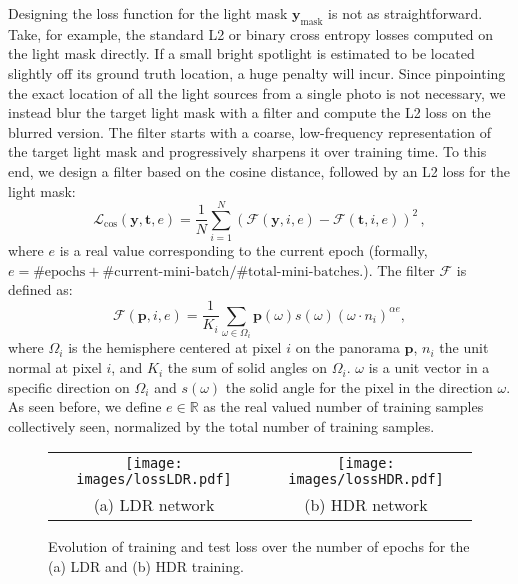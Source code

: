 Designing the loss function for the light mask $\mathbf{y}_\text{mask}$ is not as straightforward. Take, for example, the standard L2 or binary cross entropy losses computed on the light mask directly. If a small bright spotlight is estimated to be located slightly off its ground truth location, a huge penalty will incur. Since pinpointing the exact location of all the light sources from a single photo is not necessary, we instead blur the target light mask with a filter and compute the L2 loss on the blurred version. The filter starts with a coarse, low-frequency representation of the target light mask and progressively sharpens it over training time. To this end, we design a filter based on the cosine distance, followed by an L2 loss for the light mask: 
\begin{equation}
    \mathcal{L}_\text{cos}(\mathbf{y}, \mathbf{t}, e) = \frac{1}{N}\sum_{i=1}^{N} (\mathcal{F}(\mathbf{y}, i, e) - \mathcal{F}(\mathbf{t}, i, e))^2 \,,
    \label{e:maskloss}
\end{equation}
where $e$ is a real value corresponding to the current epoch (formally, $e=\textrm{\#epochs}+\textrm{\#current-mini-batch}/\textrm{\#total-mini-batches}$.). The filter $\mathcal{F}$ is defined as:
\begin{equation}
    \mathcal{F}(\mathbf{p}, i, e) = \frac{1}{K_i} \sum_{\omega \in \Omega_i} \mathbf{p}(\omega) s(\omega) \left( \omega \cdot n_i \right)^{\alpha e},
    \label{e:filter}
\end{equation}
where $\Omega_i$ is the hemisphere centered at pixel $i$ on the panorama $\mathbf{p}$,  $n_i$ the unit normal at pixel $i$, and $K_i$ the sum of solid angles on $\Omega_i$. $\omega$ is a unit vector in a specific direction on $\Omega_i$ and $s(\omega)$ the solid angle for the pixel in the direction $\omega$. As seen before, we define $e\in\mathbb{R}$ as the real valued number of training samples collectively seen, normalized by the total number of training samples. 

\begin{figure}
\centering
\footnotesize
\setlength{\tabcolsep}{1pt}
\begin{tabular}{cc}
\texttt{[image: images/lossLDR.pdf]} &
\texttt{[image: images/lossHDR.pdf]} \\
(a) LDR network & (b) HDR network
\end{tabular}
\caption{Evolution of training and test loss over the number of epochs for the (a) LDR and (b) HDR training.}
\label{f:learning-curves}
\end{figure}

